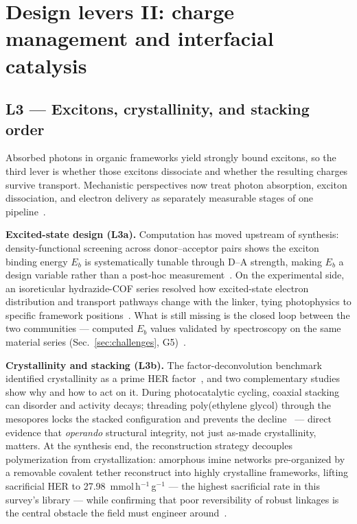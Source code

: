 \section{Design levers II: charge management and interfacial catalysis}
\label{sec:charge}

\subsection{L3 --- Excitons, crystallinity, and stacking order}
\label{sec:excitons}

Absorbed photons in organic frameworks yield strongly bound excitons, so the third lever is
whether those excitons dissociate and whether the resulting charges survive transport.
Mechanistic perspectives now treat photon absorption, exciton dissociation, and electron
delivery as separately measurable stages of one pipeline~\cite{blatte2024photons}.

\textbf{Excited-state design (L3a).} Computation has moved upstream of synthesis:
density-functional screening across donor--acceptor pairs shows the exciton binding energy
$E_b$ is systematically tunable through D--A strength, making $E_b$ a design variable rather
than a post-hoc measurement~\cite{qian2023computation}. On the experimental side, an
isoreticular hydrazide-COF series resolved how excited-state electron distribution and
transport pathways change with the linker, tying photophysics to specific framework
positions~\cite{chen2023tuning}. What is still missing is the closed loop between the two
communities --- computed $E_b$ values validated by spectroscopy on the same material series
(Sec.~\ref{sec:challenges}, G5)~\cite{qian2023computation,chen2023tuning,blatte2024photons}.

\textbf{Crystallinity and stacking (L3b).} The factor-deconvolution benchmark identified
crystallinity as a prime HER factor~\cite{ghosh2020identification}, and two complementary
studies show why and how to act on it. During photocatalytic cycling, coaxial stacking can
disorder and activity decays; threading poly(ethylene glycol) through the mesopores locks the
stacked configuration and prevents the decline~\cite{zhou2021peg} --- direct evidence that
\emph{operando} structural integrity, not just as-made crystallinity, matters. At the synthesis
end, the reconstruction strategy decouples polymerization from crystallization: amorphous
imine networks pre-organized by a removable covalent tether reconstruct into highly crystalline
frameworks, lifting sacrificial HER to 27.98~mmol\,h$^{-1}$\,g$^{-1}$ --- the highest
sacrificial rate in this survey's library --- while confirming that poor reversibility of
robust linkages is the central obstacle the field must engineer
around~\cite{zhang2022reconstructed,haase2020solving}.

